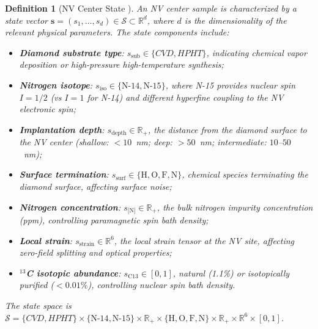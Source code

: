 \documentclass[11pt,a4paper]{article}
\newtheorem{definition}[theorem]{Definition}
\theoremstyle{definition}
\newcommand{\R}{\mathbb{R}}
\newcommand{\cS}{\mathcal{S}}
\newcommand{\NV}{NV}
\newcommand{\CVD}{CVD}
\newcommand{\HPHT}{HPHT}
\begin{document}
\begin{definition}[NV Center State ]
\label{def:nv_state}
An \NV{} center sample is characterized by a state vector
$\mathbf{s} = (s_1, \dots, s_d) \in \cS \subset \R^d$, where $d$ is the
dimensionality of the relevant physical parameters. The state components include:
\begin{itemize}[nosep]
    \item \textbf{Diamond substrate type}: $s_{\text{sub}} \in \{\CVD{}, \HPHT{}\}$,
    indicating chemical vapor deposition or high-pressure high-temperature synthesis;
    \item \textbf{Nitrogen isotope}: $s_{\text{iso}} \in \{\text{N-14}, \text{N-15}\}$,
    where N-15 provides nuclear spin $I=1/2$ (vs $I=1$ for N-14) and
    different hyperfine coupling to the \NV{} electronic spin;
    \item \textbf{Implantation depth}: $s_{\text{depth}} \in \R_+$, the distance
    from the diamond surface to the \NV{} center (shallow: $<10$~nm;
    deep: $>50$~nm; intermediate: $10$--$50$~nm);
    \item \textbf{Surface termination}: $s_{\text{surf}} \in \{\text{H}, \text{O}, \text{F}, \text{N}\}$,
    chemical species terminating the diamond surface, affecting surface noise;
    \item \textbf{Nitrogen concentration}: $s_{\text{[N]}} \in \R_+$, the
    bulk nitrogen impurity concentration (ppm), controlling paramagnetic spin bath density;
    \item \textbf{Local strain}: $s_{\text{strain}} \in \R^6$, the local
    strain tensor at the \NV{} site, affecting zero-field splitting and
    optical properties;
    \item \textbf{${}^{13}$C isotopic abundance}: $s_{\text{C13}} \in [0, 1]$,
    natural (1.1\%) or isotopically purified ($<0.01\%$), controlling nuclear spin bath density.
\end{itemize}
The state space is $\cS = \{\CVD, \HPHT\} \times \{\text{N-14}, \text{N-15}\}
\times \R_+ \times \{\text{H}, \text{O}, \text{F}, \text{N}\} \times \R_+ \times \R^6 \times [0,1]$.
\end{definition}
\end{document}
